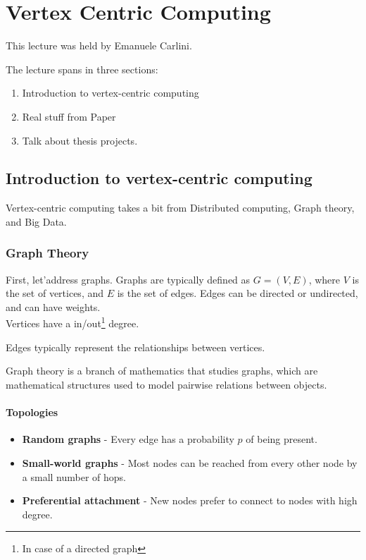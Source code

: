 \chapter{Vertex Centric Computing}
\label{chap:vertex-centric-computing}

This lecture was held by Emanuele Carlini.

The lecture spans in three sections:
\begin{enumerate}
   \item Introduction to vertex-centric computing
   \item Real stuff from Paper
   \item Talk about thesis projects.
\end{enumerate}

\section{Introduction to vertex-centric computing}

Vertex-centric computing takes a bit from Distributed computing, Graph theory, and Big Data.

\subsection{Graph Theory}
First, let'address graphs. Graphs are typically defined as $G = (V, E)$, where $V$ is the set of vertices, and $E$ is the set of edges. Edges can be directed or undirected, and can have weights.\\
Vertices have a in/out\footnote{In case of a directed graph} degree.

Edges typically represent the relationships between vertices.

\begin{definition}
   Graph theory is a branch of mathematics that studies graphs, which are mathematical structures used to model pairwise relations between objects.
\end{definition}

\subsubsection{Topologies}
\begin{itemize}
   \item \textbf{Random graphs} - Every edge has a probability $p$ of being present.
   \item \textbf{Small-world graphs} - Most nodes can be reached from every other node by a small number of hops.
   \item \textbf{Preferential attachment} - New nodes prefer to connect to nodes with high degree.
\end{itemize}

